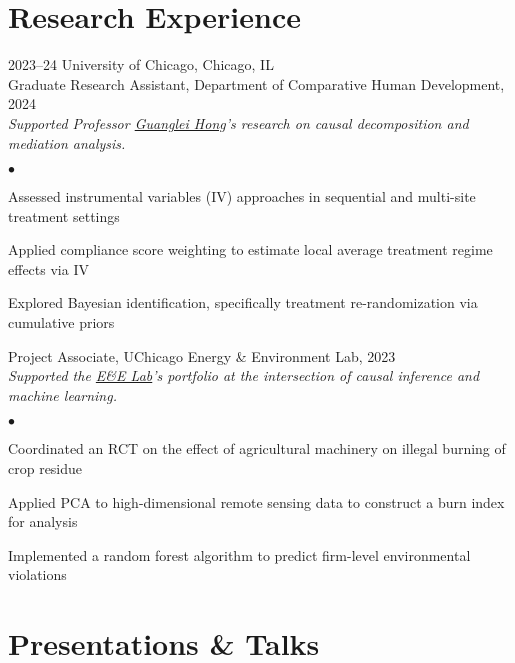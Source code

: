 \documentclass[11pt,letterpaper]{report}
\newenvironment{list2}{
  \begin{list}{\tiny$\bullet$}{%
      \setlength{\itemsep}{0in}
      \setlength{\parsep}{0in} \setlength{\parskip}{0in}
      \setlength{\topsep}{0in} \setlength{\partopsep}{0in} 
      \setlength{\leftmargin}{0.2in}}}{\end{list}}
\begin{document}
\section*{Research Experience}

\begin{tablist}
\item[2023--24] \tab{}University of Chicago, Chicago, IL\\ 
Graduate Research Assistant, Department of Comparative Human Development, 2024\\  
\emph{Supported Professor \href{https://voices.uchicago.edu/ghong/}{Guanglei Hong}'s research on causal decomposition and mediation analysis.}

\vspace*{.05in}  
\begin{list2}
\item Assessed instrumental variables (IV) approaches in sequential and multi-site treatment settings 
\item Applied compliance score weighting to estimate local average treatment regime effects via IV
\item Explored Bayesian identification, specifically treatment re-randomization via cumulative priors 
\end{list2}

\vspace*{.1in}
Project Associate, UChicago Energy \& Environment Lab, 2023\\  
\emph{Supported the \href{https://urbanlabs.uchicago.edu/labs/energy-environment}{E\&E Lab}'s portfolio at the intersection of causal inference and machine learning.}

\vspace*{.05in}  
\begin{list2}
\item Coordinated an RCT on the effect of agricultural machinery on illegal burning of crop residue
\item Applied PCA to high-dimensional remote sensing data to construct a burn index for analysis
\item Implemented a random forest algorithm to predict firm-level environmental violations
\end{list2}
\end{tablist}

\section*{Presentations \& Talks}
\end{document}
